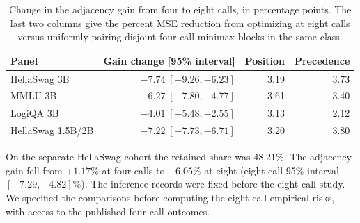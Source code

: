 \begin{table}[h]
\centering
\caption{Change in the adjacency gain from four to eight calls, in percentage points.
The last two columns give the percent MSE reduction from optimizing at eight calls
versus uniformly pairing disjoint four-call minimax blocks in the same class.}
\begin{tabular}{@{}lrrr@{}}
\toprule
Panel & Gain change [95\% interval] & Position & Precedence \\
\midrule
HellaSwag 3B & $-7.74\;[-9.26,-6.23]$ & 3.19 & 3.73 \\
MMLU 3B & $-6.27\;[-7.80,-4.77]$ & 3.61 & 3.40 \\
LogiQA 3B & $-4.01\;[-5.48,-2.55]$ & 3.13 & 2.12 \\
HellaSwag 1.5B/2B & $-7.22\;[-7.73,-6.71]$ & 3.20 & 3.80 \\
\bottomrule
\end{tabular}
\end{table}

On the separate HellaSwag cohort the retained share was $48.21\%$.
The adjacency gain fell from $+1.17\%$ at four calls to $-6.05\%$
at eight (eight-call 95\% interval $[-7.29,-4.82]\%$).
The inference records were fixed before the eight-call study. We
specified the comparisons before computing the eight-call empirical
risks, with access to the published four-call outcomes.
